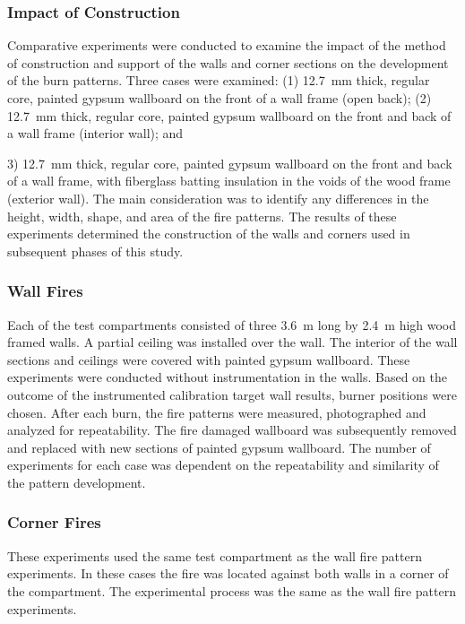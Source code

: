 \documentclass[twoside]{uocthesis}
\begin{document}
\subsubsection{Impact of Construction}

Comparative experiments were conducted to examine the impact of the method of construction and support of the walls and corner sections on the development of the burn patterns.  Three cases were examined: (1) 12.7~mm thick, regular core, painted gypsum wallboard on the front of a wall frame (open back); (2) 12.7~mm thick, regular core, painted gypsum wallboard on the front and back of a wall frame (interior wall); and {3) 12.7~mm thick, regular core, painted gypsum wallboard on the front and back of a wall frame, with fiberglass batting insulation in the voids of the wood frame (exterior wall).  The main consideration was to identify any differences in the height, width, shape, and area of the fire patterns. The results of these experiments determined the construction of the walls and corners used in subsequent phases of this study.

\subsubsection{Wall Fires}

Each of the test compartments consisted of three 3.6~m long by 2.4~m high wood framed walls. A partial ceiling was installed over the wall. The interior of the wall sections and ceilings were covered with painted gypsum wallboard.  These experiments were conducted without instrumentation in the walls.  Based on the outcome of the instrumented calibration target wall results, burner positions were chosen. After each burn, the fire patterns were measured, photographed and analyzed for repeatability. The fire damaged wallboard was subsequently removed and replaced with new sections of painted gypsum wallboard. The number of experiments for each case was dependent on the repeatability and similarity of the pattern development.

\subsubsection{Corner Fires}

These experiments used the same test compartment as the wall fire pattern experiments.  In these cases the fire was located against both walls in a corner of the compartment.  The experimental process was the same as the wall fire pattern experiments.

}
\end{document}
